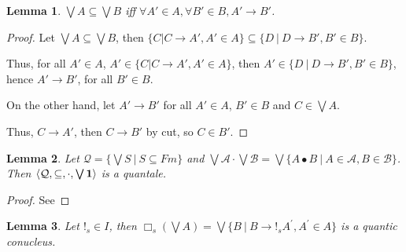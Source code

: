 \documentclass[a4paper]{article}
\newtheorem{lemma}{Lemma}
\begin{document}
\begin{lemma}
  $\bigvee A \subseteq \bigvee B$ iff $\forall A' \in A, \forall B' \in B, A' \rightarrow B'$.
\end{lemma}

\begin{proof}
  Let $\bigvee A \subseteq \bigvee B$,
  then $\{ C | C \rightarrow A', A' \in A \} \subseteq \{ D \: | \: D \rightarrow B', B' \in B \}$.

Thus, for all $A' \in A$, $A' \in \{ C | C \rightarrow A', A' \in A \}$,
then $A' \in \{ D \: | \: D \rightarrow B', B' \in B \}$, hence $A' \rightarrow B'$, for all $B' \in B$.

On the other hand, let $A' \rightarrow B'$ for all $A' \in A$, $B' \in B$ and $C \in \bigvee A$.

Thus, $C \rightarrow A'$, then $C \rightarrow B'$ by cut, so $C \in B'$.

\end{proof}

\begin{lemma}
  Let $\mathcal{Q} = \{ \bigvee S \: | \: S \subseteq Fm \}$ and $\bigvee \mathcal{A} \cdot \bigvee \mathcal{B} =
  \bigvee \{ A \bullet B \: | \: A \in \mathcal{A}, B \in \mathcal{B} \}$.
  Then $\langle \mathcal{Q}, \subseteq, \cdot, \bigvee{{\bf 1}}\rangle$ is a quantale.
\end{lemma}

\begin{proof}
  See
\end{proof}

\begin{lemma}
  Let $!_s \in I$, then $\Box_s (\bigvee A) = \bigvee \{ B \: | \: B \rightarrow !_s A^{'}, A^{'} \in A \}$
  is a quantic conucleus.
\end{lemma}
\end{document}
